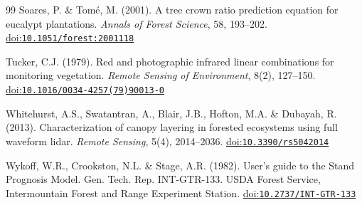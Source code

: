 \documentclass[12pt,a4paper,twoside]{article}
\makeatletter
\providecommand{\doi}[1]{%
  \begingroup
  \let\bibinfo\@secondoftwo
  \urlstyle{rm}%
  \href{https://doi.org/#1}{doi:\nolinkurl{#1}}%
  \endgroup
}
\makeatother
\begin{document}
\begin{thebibliography}{99}
Soares, P. \& Tom\'e, M. (2001).
\newblock A tree crown ratio prediction equation for eucalypt plantations.
\newblock \textit{Annals of Forest Science}, 58, 193--202.
\newblock \doi{10.1051/forest:2001118}

Tucker, C.J. (1979).
\newblock Red and photographic infrared linear combinations for monitoring
  vegetation.
\newblock \textit{Remote Sensing of Environment}, 8(2), 127--150.
\newblock \doi{10.1016/0034-4257(79)90013-0}

Whitehurst, A.S., Swatantran, A., Blair, J.B., Hofton, M.A. \& Dubayah, R.
  (2013).
\newblock Characterization of canopy layering in forested ecosystems using full
  waveform lidar.
\newblock \textit{Remote Sensing}, 5(4), 2014--2036.
\newblock \doi{10.3390/rs5042014}

Wykoff, W.R., Crookston, N.L. \& Stage, A.R. (1982).
\newblock User's guide to the Stand Prognosis Model.
\newblock Gen. Tech. Rep. INT-GTR-133. USDA Forest Service, Intermountain
  Forest and Range Experiment Station.
\newblock \doi{10.2737/INT-GTR-133}

\end{thebibliography}
\end{document}
